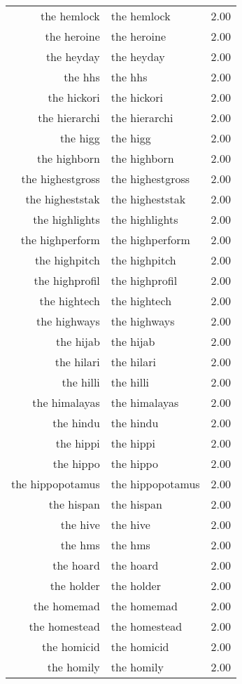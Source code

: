 \begin{table}[ht]
\begin{tabular}{rlr}
  the hemlock & the hemlock & 2.00 \\ 
  the heroine & the heroine & 2.00 \\ 
  the heyday & the heyday & 2.00 \\ 
  the hhs & the hhs & 2.00 \\ 
  the hickori & the hickori & 2.00 \\ 
  the hierarchi & the hierarchi & 2.00 \\ 
  the higg & the higg & 2.00 \\ 
  the highborn & the highborn & 2.00 \\ 
  the highestgross & the highestgross & 2.00 \\ 
  the higheststak & the higheststak & 2.00 \\ 
  the highlights & the highlights & 2.00 \\ 
  the highperform & the highperform & 2.00 \\ 
  the highpitch & the highpitch & 2.00 \\ 
  the highprofil & the highprofil & 2.00 \\ 
  the hightech & the hightech & 2.00 \\ 
  the highways & the highways & 2.00 \\ 
  the hijab & the hijab & 2.00 \\ 
  the hilari & the hilari & 2.00 \\ 
  the hilli & the hilli & 2.00 \\ 
  the himalayas & the himalayas & 2.00 \\ 
  the hindu & the hindu & 2.00 \\ 
  the hippi & the hippi & 2.00 \\ 
  the hippo & the hippo & 2.00 \\ 
  the hippopotamus & the hippopotamus & 2.00 \\ 
  the hispan & the hispan & 2.00 \\ 
  the hive & the hive & 2.00 \\ 
  the hms & the hms & 2.00 \\ 
  the hoard & the hoard & 2.00 \\ 
  the holder & the holder & 2.00 \\ 
  the homemad & the homemad & 2.00 \\ 
  the homestead & the homestead & 2.00 \\ 
  the homicid & the homicid & 2.00 \\ 
  the homily & the homily & 2.00 \\ 

\end{tabular}
\end{table}
